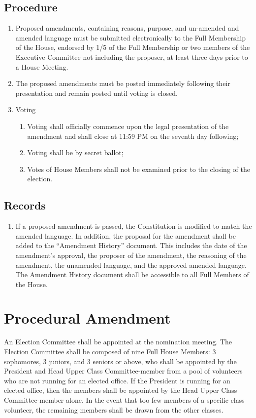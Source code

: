 \documentclass[10pt]{article} %
\begin{document}
\subsection{Procedure}
\begin{enumerate}
\item Proposed amendments, containing reasons, purpose, and un-amended and amended language must be submitted electronically to the Full Membership of the House, endorsed by 1/5 of the Full Membership or two members of the Executive Committee not including the proposer, at least three days prior to a House Meeting.
\item The proposed amendments must be posted immediately following their presentation and remain posted until voting is closed.
\item Voting
\begin{enumerate}
\item Voting shall officially commence upon the legal presentation of the amendment and shall close at 11:59 PM on the seventh day following;
\item Voting shall be by secret ballot;
\item Votes of House Members shall not be examined prior to the closing of the election.
\end{enumerate}
\end{enumerate}

\subsection{Records}
\begin{enumerate}
    \item If a proposed amendment is passed, the Constitution is modified to match the amended language. In addition, the proposal for the amendment shall be added to the “Amendment History” document. This includes the date of the amendment's approval, the proposer of the amendment, the reasoning of the amendment, the unamended language, and the approved amended language. The Amendment History document shall be accessible to all Full Members of the House.
\end{enumerate}


\pagebreak
\appendix
\section{Procedural Amendment}
\label{ProceduralAmendment}
An Election Committee shall be appointed at the nomination meeting. The Election Committee shall be composed of nine Full House Members: 3 sophomores, 3 juniors, and 3 seniors or above, who shall be appointed by the President and Head Upper Class Committee-member from a pool of volunteers who are not running for an elected office. If the President is running for an elected office, then the members shall be appointed by the Head Upper Class Committee-member alone. In the event that too few members of a specific class volunteer, the remaining members shall be drawn from the other classes.
\end{document}
